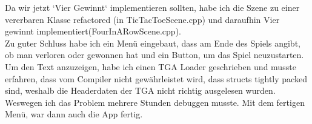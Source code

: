 Da wir jetzt `Vier Gewinnt` implementieren sollten, habe ich die Szene zu einer vererbaren Klasse refactored (in TicTacToeScene.cpp) und daraufhin Vier gewinnt implementiert(FourInARowScene.cpp). \\

Zu guter Schluss habe ich ein Menü eingebaut, dass am Ende des Spiels angibt, ob man
verloren oder gewonnen hat und ein Button, um das Spiel neuzustarten.
Um den Text anzuzeigen, habe ich einen TGA Loader geschrieben und musste
erfahren, dass vom Compiler nicht gewährleistet wird, dass structs tightly packed
sind, weshalb die Headerdaten der TGA nicht richtig ausgelesen wurden. Weswegen ich das Problem mehrere Stunden debuggen musste. Mit dem fertigen Menü, war dann auch die App fertig.
